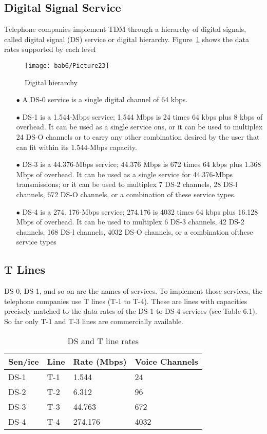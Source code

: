 \subsection*{Digital Signal Service}
Telephone companies implement TDM through a hierarchy of digital signals, called digital signal (DS) service or digital hierarchy. Figure~\ref{fig6:22} shows the data rates supported by each level

\begin{figure}[htbp]
  \centering
  \texttt{[image: bab6/Picture23]}
  \caption{Digital hierarchy}
  \label{fig6:22}
\end{figure}

\begin{itemize}
  \item[$\bullet$] A DS-0 service is a single digital channel of 64 kbps.
  \item[$\bullet$] DS-1 is a 1.544-Mbps service; 1.544 Mbps is 24 times 64 kbps plus 8 kbps of overhead. It can be used as a single service ons, or it can be used to multiplex 24 DS-O channels or to carry any other combination desired by the user that can fit within its 1.544-Mbps capacity.
  \item[$\bullet$] DS-3 is a 44.376-Mbps service; 44.376 Mbps is 672 times 64 kbps plus 1.368 Mbps of overhead. It can be used as a single service for 44.376-Mbps transmissions; or it can be used to multiplex 7 DS-2 channels, 28 DS-l channels, 672 DS-O channels, or a combination of these service types.
  \item[$\bullet$] DS-4 is a 274. 176-Mbps service; 274.176 is 4032 times 64 kbps plus 16.128 Mbps of overhead. It can be used to multiplex 6 DS-3 channels, 42 DS-2 channels, 168 DS-l channels, 4032 DS-O channels, or a combination ofthese service types
\end{itemize}

\subsection*{T Lines}
DS-0, DS-1, and so on are the names of services. To implement those services, the telephone companies use T lines (T-1 to T-4). These are lines with capacities precisely matched to the data rates of the DS-1 to DS-4 services (see Table 6.1). So far only T-1 and T-3 lines are commercially available.

\begin{table}[htbp]
  \centering
  \caption{DS and T line rates}
  \begin{tabular}{p{} p{} p{} p{}} 
   \toprule
   Sen/ice & Line & Rate (Mbps) & Voice Channels \\
   \midrule
   DS-1 & T-1 & 1.544 & 24 \\ 
   DS-2 & T-2 & 6.312 & 96 \\
   DS-3 & T-3 & 44.763 & 672 \\
   DS-4 & T-4 & 274.176 & 4032 \\
   \bottomrule
  \end{tabular}
  \label{tab6:1}
\end{table}

